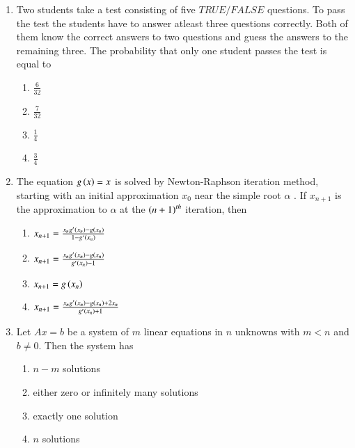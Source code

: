 \documentclass[journal]{IEEEtran}
\begin{document}
\begin{enumerate}
    \item Two students take a test consisting of five $TRUE / FALSE$ questions. To pass the test the students have to answer atleast three questions correctly. Both of them know the correct answers to two questions and guess the answers to the remaining three. The probability that only one student passes the test is equal to
        \begin{enumerate}
            \item $\frac{6}{32}$
            \item $\frac{7}{32}$
            \item $\frac{1}{4}$
            \item $\frac{3}{4}$
        \end{enumerate}

    \item The equation $g\left(x\right) = x$ is solved by Newton-Raphson iteration method, starting with an initial approximation $x_0$ near the simple root $\alpha$ . If $x_{n+1}$ is the approximation to $\alpha$ at the $\left(n+1\right)^{th}$ iteration, then
        \begin{enumerate}
            \item $x_{n+1} = \frac{x_n g^{\prime}\left(x_n\right)-g\left(x_n\right)}{1 - g^{\prime}\left(x_n\right)}$
            \item $x_{n+1} = \frac{x_n g^{\prime}\left(x_n\right)-g\left(x_n\right)}{g^{\prime}\left(x_n\right)-1}$
            \item $x_{n+1} = g\left(x_n\right)$
            \item $x_{n+1} = \frac{x_n g^{\prime}\left(x_n\right)-g\left(x_n\right)+ 2 x_n}{g^{\prime}\left(x_n\right)+1}$
        \end{enumerate}

    \item Let $Ax= b$ be a system of $m$ linear equations in $n$ unknowns with $m< n$ and $b\neq0$. Then the system has
        \begin{enumerate}
            \item $n-m$ solutions
            \item either zero or infinitely many solutions
            \item exactly one solution
            \item $n$ solutions
        \end{enumerate}


\end{enumerate}
\end{document}
